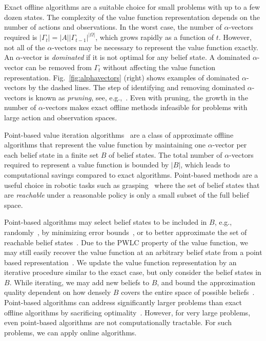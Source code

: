 \documentclass[journal]{IEEEtran}
\begin{document}
Exact offline algorithms are a suitable choice for small problems with up to a few dozen states.
The complexity of the value function representation depends on the number of actions and observations.
In the worst case,
the number of $\alpha$-vectors required is $|\Gamma_t| = |A||\Gamma_{t-1}|^{|\Omega|}$, which grows rapidly as {a} function of $t$.
However, {not} all of the $\alpha$-vectors may be necessary to represent
the value function exactly.  An $\alpha$-vector is \emph{dominated} if it is not optimal for any belief state.
A dominated $\alpha$-vector can
be removed from $\Gamma_t$ without affecting the value function
representation.
{Fig.~\ref{fig:alphavectors} (right) shows examples of dominated $\alpha$-vectors by the dashed lines.}
The step of
identifying and removing dominated $\alpha$-vectors is known as
\emph{pruning}, see,
e.g.,~\cite{monahan1982state,white1991survey,lovejoy1991survey,hauskrecht2000value}.
Even with pruning, the growth in the number of $\alpha$-vectors makes exact offline methods infeasible for problems with large action and observation spaces.

Point-based value iteration
algorithms~\cite{shani2013survey,pineau2006anytime,smith2004heuristic,spaan2005perseus,kurniawati2008sarsop}
are a class of approximate offline algorithms that represent the value
function by maintaining one $\alpha$-vector per each belief state in a
finite set $B$ of belief states.
The total number of
$\alpha$-vectors required to represent a value function is bounded by
$|B|$, which leads to computational savings compared to exact
algorithms.
Point-based methods are a useful choice in robotic tasks such as grasping~\cite{hsiao2007grasping} where the set of belief states that are \emph{reachable} under a reasonable policy is only a small subset of the full belief space.

Point-based algorithms may
select belief states to be included in $B$, e.g., randomly~\cite{spaan2005perseus}, by minimizing error
bounds~\cite{smith2004heuristic,pineau2006anytime}, or to {better} approximate the set of reachable belief states~\cite{kurniawati2008sarsop}.
Due to the PWLC property of the value function, {we may still easily recover} the value
function at an arbitrary belief state from a
point based representation~\cite{pineau2006anytime}. {We update the value
function representation by an iterative procedure similar
to the exact case, but only consider the belief states in $B$.}
While iterating, {we may add new beliefs to $B$, and bound the
approximation quality dependent on how densely $B$ covers the entire space of possible beliefs~\cite{pineau2006anytime}.}
Point-based algorithms can address significantly larger problems than exact offline algorithms {by sacrificing optimality}~\cite{pineau2006anytime}.
{However, for very large problems, even point-based algorithms are not computationally tractable.
For such problems, we can apply online algorithms.}
\end{document}
